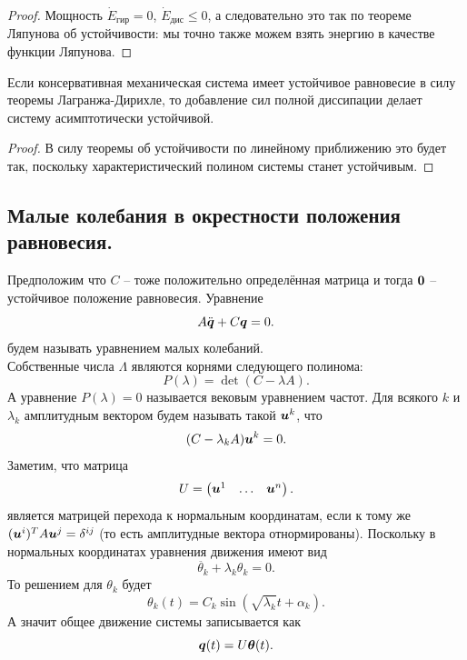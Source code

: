 \begin{proof}
    Мощность $\dot{E}_{\text{гир}} = 0$, $\dot{E}_{\text{дис}} \leq 0$, а следовательно это так по теореме Ляпунова об устойчивости: мы точно также можем взять энергию в качестве функции Ляпунова.
\end{proof}
\begin{theorem}
    Если консервативная механическая система имеет устойчивое равновесие в силу теоремы Лагранжа-Дирихле, то добавление сил полной диссипации делает систему асимптотически устойчивой.
\end{theorem}
\begin{proof}
    В силу теоремы об устойчивости по линейному приближению это будет так, поскольку характеристический полином системы станет устойчивым.
\end{proof}
\subsection{Малые колебания в окрестности положения равновесия.}
Предположим что $C$ -- тоже положительно определённая матрица и тогда $\boldsymbol{0}$ -- устойчивое положение равновесия.
Уравнение
\[
    A \ddot{\boldsymbol{q}} + C\boldsymbol{q} = 0.
\]
будем называть уравнением малых колебаний. \\
Собственные числа $\Lambda$ являются корнями следующего полинома:
\[
    P(\lambda) = \det (C - \lambda A).
\]
А уравнение $P(\lambda) = 0$ называется вековым уравнением частот.
Для всякого $k$ и $\lambda_k$ амплитудным вектором будем называть такой $\boldsymbol{u}^k$, что
\[
    (C - \lambda_k A)\boldsymbol{u}^k = 0.
\]
Заметим, что матрица
\[
    U = \begin{pmatrix*} \bt{u}^1 & \ldots & \bt{u}^n
    \end{pmatrix*}.
\]
является матрицей перехода к нормальным координатам, если к тому же $(\boldsymbol{u}^i)^T A \boldsymbol{u}^j = \delta^{ij}$ (то есть амплитудные вектора отнормированы).
Поскольку в нормальных координатах уравнения движения имеют вид
\[
    \ddot{\theta_k} + \lambda_k \theta_k = 0.
\]
То решением для $\theta_k$ будет
\[
    \theta_k(t) = C_k \sin (\sqrt {\lambda_k} t +\alpha_k).
\]
А значит общее движение системы записывается как
\[
    \boldsymbol{q}(t) = U\boldsymbol{\theta}(t).
\]